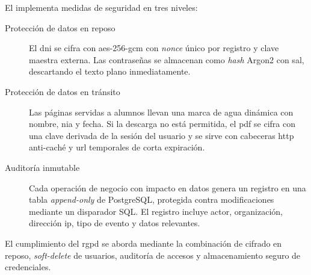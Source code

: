 El  implementa medidas de seguridad en tres niveles:

\begin{description}
  \item[Protección de datos en reposo] El \acs{dni} se cifra con
  \acs{aes}-256-\acs{gcm} con \textit{nonce} único por registro y clave
  maestra externa. Las contraseñas se almacenan como \textit{hash} Argon2
  con sal, descartando el texto plano inmediatamente.

  \item[Protección de datos en tránsito] Las páginas servidas a alumnos
  llevan una marca de agua dinámica con nombre, \acs{nia} y fecha. Si la
  descarga no está permitida, el \acs{pdf} se cifra con una clave
  derivada de la sesión del usuario y se sirve con cabeceras
  \acs{http} anti-caché y \acs{url} temporales de corta expiración.

  \item[Auditoría inmutable] Cada operación de negocio con impacto en
  datos genera un registro en una tabla \textit{append-only} de
  PostgreSQL, protegida contra modificaciones mediante un disparador SQL.
  El registro incluye actor, organización, dirección \acs{ip}, tipo de
  evento y datos relevantes.
\end{description}

El cumplimiento del \acs{rgpd} se aborda mediante la combinación de
cifrado en reposo, \textit{soft-delete} de usuarios, auditoría de accesos
y almacenamiento seguro de credenciales.
